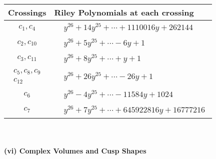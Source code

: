 \documentclass[1p]{elsarticle_modified}
\theoremstyle{definition}
\begin{document}
\begin{tabular}{m{50pt}|m{274pt}}
Crossings & \hspace{64pt}Riley Polynomials at each crossing \\
\hline $$\begin{aligned}c_{1},c_{4}\end{aligned}$$&$\begin{aligned}
&y^{26}+14 y^{25}+\cdots+1110016 y+262144
\end{aligned}$\\
\hline $$\begin{aligned}c_{2},c_{10}\end{aligned}$$&$\begin{aligned}
&y^{26}+5 y^{25}+\cdots-6 y+1
\end{aligned}$\\
\hline $$\begin{aligned}c_{3},c_{11}\end{aligned}$$&$\begin{aligned}
&y^{26}+8 y^{25}+\cdots+y+1
\end{aligned}$\\
\hline $$\begin{aligned}c_{5},c_{8},c_{9}\\c_{12}\end{aligned}$$&$\begin{aligned}
&y^{26}+26 y^{25}+\cdots-26 y+1
\end{aligned}$\\
\hline $$\begin{aligned}c_{6}\end{aligned}$$&$\begin{aligned}
&y^{26}-4 y^{25}+\cdots-11584 y+1024
\end{aligned}$\\
\hline $$\begin{aligned}c_{7}\end{aligned}$$&$\begin{aligned}
&y^{26}+7 y^{25}+\cdots+645922816 y+16777216
\end{aligned}$\\
\hline
\end{tabular}\\~\\
\newpage\flushleft \textbf{(vi) Complex Volumes and Cusp Shapes}
\end{document}
